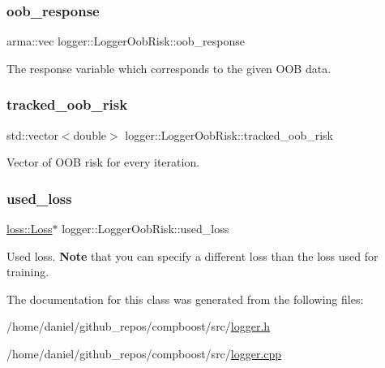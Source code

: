 \subsubsection{\texorpdfstring{oob\+\_\+response}{oob\_response}}
{\footnotesize\ttfamily arma\+::vec logger\+::\+Logger\+Oob\+Risk\+::oob\+\_\+response\hspace{0.3cm}{\ttfamily [private]}}



The response variable which corresponds to the given O\+OB data. 

\mbox{\label{classlogger_1_1_logger_oob_risk_abdc2e187dc393056b2986882dbb5b03f}} 
\subsubsection{\texorpdfstring{tracked\+\_\+oob\+\_\+risk}{tracked\_oob\_risk}}
{\footnotesize\ttfamily std\+::vector$<$double$>$ logger\+::\+Logger\+Oob\+Risk\+::tracked\+\_\+oob\+\_\+risk\hspace{0.3cm}{\ttfamily [private]}}



Vector of O\+OB risk for every iteration. 

\mbox{\label{classlogger_1_1_logger_oob_risk_af889f26216d86721dcab4fb0823ac525}} 
\subsubsection{\texorpdfstring{used\+\_\+loss}{used\_loss}}
{\footnotesize\ttfamily \hyperlink{classloss_1_1_loss}{loss\+::\+Loss}$\ast$ logger\+::\+Logger\+Oob\+Risk\+::used\+\_\+loss\hspace{0.3cm}{\ttfamily [private]}}



Used loss. {\bfseries Note} that you can specify a different loss than the loss used for training. 



The documentation for this class was generated from the following files\+:\begin{DoxyCompactItemize}
\item 
/home/daniel/github\+\_\+repos/compboost/src/\hyperlink{logger_8h}{logger.\+h}\item 
/home/daniel/github\+\_\+repos/compboost/src/\hyperlink{logger_8cpp}{logger.\+cpp}\end{DoxyCompactItemize}
